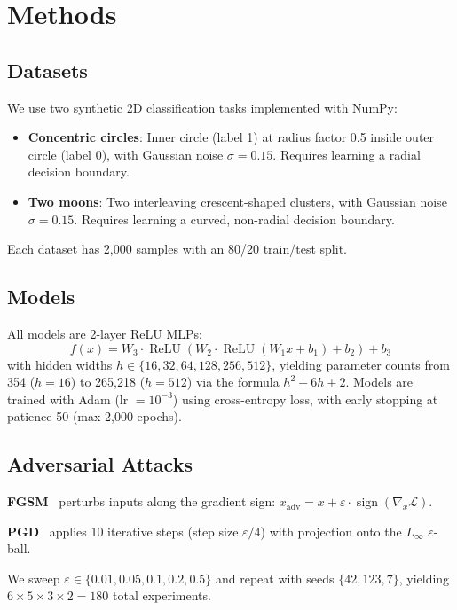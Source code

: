 \documentclass[11pt,a4paper]{article}
\begin{document}
\section{Methods}

\subsection{Datasets}

We use two synthetic 2D classification tasks implemented with NumPy:
\begin{itemize}
    \item \textbf{Concentric circles}: Inner circle (label 1) at radius factor 0.5
          inside outer circle (label 0), with Gaussian noise $\sigma = 0.15$.
          Requires learning a radial decision boundary.
    \item \textbf{Two moons}: Two interleaving crescent-shaped clusters,
          with Gaussian noise $\sigma = 0.15$.
          Requires learning a curved, non-radial decision boundary.
\end{itemize}
Each dataset has 2{,}000 samples with an 80/20 train/test split.

\subsection{Models}

All models are 2-layer ReLU MLPs:
\[
f(x) = W_3 \cdot \operatorname{ReLU}(W_2 \cdot \operatorname{ReLU}(W_1 x + b_1) + b_2) + b_3
\]
with hidden widths $h \in \{16, 32, 64, 128, 256, 512\}$, yielding parameter counts
from 354 ($h=16$) to 265{,}218 ($h=512$) via the formula $h^2 + 6h + 2$.
Models are trained with Adam (lr $= 10^{-3}$) using cross-entropy loss,
with early stopping at patience 50 (max 2{,}000 epochs).

\subsection{Adversarial Attacks}

\textbf{FGSM}~\citep{goodfellow2015explaining} perturbs inputs along the gradient sign:
$x_{\mathrm{adv}} = x + \varepsilon \cdot \operatorname{sign}(\nabla_x \mathcal{L})$.

\textbf{PGD}~\citep{madry2018towards} applies 10 iterative steps (step size $\varepsilon/4$)
with projection onto the $L_\infty$ $\varepsilon$-ball.

We sweep $\varepsilon \in \{0.01, 0.05, 0.1, 0.2, 0.5\}$ and repeat with seeds
$\{42, 123, 7\}$, yielding $6 \times 5 \times 3 \times 2 = 180$ total experiments.
\end{document}
